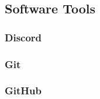 \subsection{Software Tools}
\subsubsection{Discord}
\subsubsection{Git}
\subsubsection{GitHub}
\subsubsection{}
